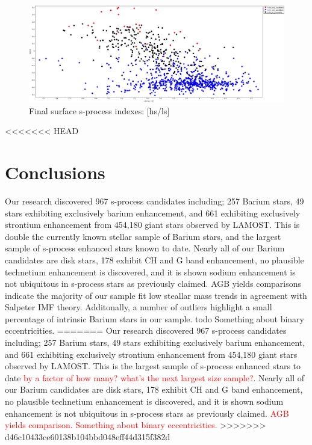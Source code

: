 \documentclass[a4paper,fleqn,usenatbib]{mnras}
\newcommand{\todo}[1]{\textcolor{red}{#1}}
\begin{document}
\begin{figure}
	\includegraphics[width=\columnwidth]{basrtest4.png}
    \caption{Final surface s-process indexes: [hs/ls]}
    \label{fig:figure3}
\end{figure}

<<<<<<< HEAD

\section{Conclusions} \label{sec:con}

Our research discovered 967 s-process candidates including; 257 Barium stars, 49 stars exhibiting exclusively barium enhancement, and 661 exhibiting exclusively strontium enhancement from 454,180 giant stars observed by LAMOST. This is double the currently known stellar sample of Barium stars, and the largest sample of s-process enhanced stars known to date. Nearly all of our Barium candidates are disk stars, 178 exhibit CH and G band enhancement, no plausible technetium enhancement is discovered, and it is shown sodium enhancement is not ubiquitous in s-process stars as previously claimed. AGB yields comparisons indicate the majority of our sample fit low steallar mass trends in agreement with Salpeter IMF theory. Additonally, a number of outliers highlight a small percentage of intrinsic Barium stars in our sample.
todo{ Something about binary eccentricities.}
=======
Our research discovered 967 s-process candidates including; 257 Barium stars, 49 stars exhibiting exclusively barium enhancement, and 661 exhibiting exclusively strontium enhancement from 454,180 giant stars observed by LAMOST. This is the largest sample of s-process enhanced stars to date \todo{by a factor of how many? what's the next largest size sample?}. Nearly all of our Barium candidates are disk stars, 178 exhibit CH and G band enhancement, no plausible technetium enhancement is discovered, and it is shown sodium enhancement is not ubiquitous in s-process stars as previously claimed. \todo{AGB yields comparison. Something about binary eccentricities.}
>>>>>>> d46c10433ce60138b104bbd048eff44d315f382d
\end{document}

